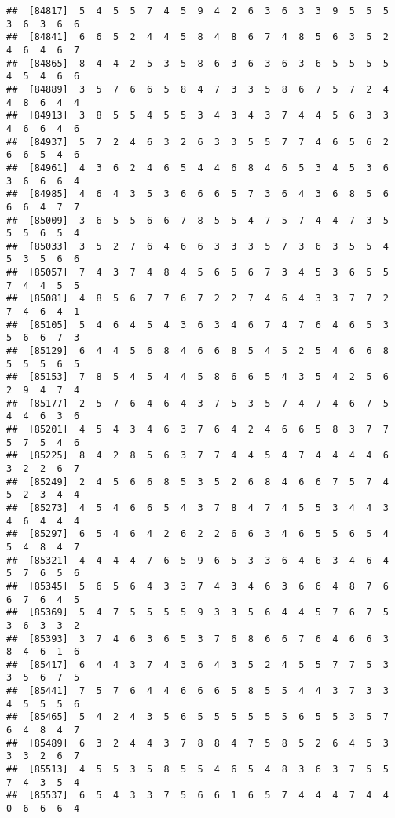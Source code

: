 \documentclass[
]{book}
\begin{document}
\begin{verbatim}
##  [84817]  5  4  5  5  7  4  5  9  4  2  6  3  6  3  3  9  5  5  5  3  6  3  6  6
##  [84841]  6  6  5  2  4  4  5  8  4  8  6  7  4  8  5  6  3  5  2  4  6  4  6  7
##  [84865]  8  4  4  2  5  3  5  8  6  3  6  3  6  3  6  5  5  5  5  4  5  4  6  6
##  [84889]  3  5  7  6  6  5  8  4  7  3  3  5  8  6  7  5  7  2  4  4  8  6  4  4
##  [84913]  3  8  5  5  4  5  5  3  4  3  4  3  7  4  4  5  6  3  3  4  6  6  4  6
##  [84937]  5  7  2  4  6  3  2  6  3  3  5  5  7  7  4  6  5  6  2  6  6  5  4  6
##  [84961]  4  3  6  2  4  6  5  4  4  6  8  4  6  5  3  4  5  3  6  3  6  6  6  4
##  [84985]  4  6  4  3  5  3  6  6  6  5  7  3  6  4  3  6  8  5  6  6  6  4  7  7
##  [85009]  3  6  5  5  6  6  7  8  5  5  4  7  5  7  4  4  7  3  5  5  5  6  5  4
##  [85033]  3  5  2  7  6  4  6  6  3  3  3  5  7  3  6  3  5  5  4  5  3  5  6  6
##  [85057]  7  4  3  7  4  8  4  5  6  5  6  7  3  4  5  3  6  5  5  7  4  4  5  5
##  [85081]  4  8  5  6  7  7  6  7  2  2  7  4  6  4  3  3  7  7  2  7  4  6  4  1
##  [85105]  5  4  6  4  5  4  3  6  3  4  6  7  4  7  6  4  6  5  3  5  6  6  7  3
##  [85129]  6  4  4  5  6  8  4  6  6  8  5  4  5  2  5  4  6  6  8  5  5  5  6  5
##  [85153]  7  8  5  4  5  4  4  5  8  6  6  5  4  3  5  4  2  5  6  2  9  4  7  4
##  [85177]  2  5  7  6  4  6  4  3  7  5  3  5  7  4  7  4  6  7  5  4  4  6  3  6
##  [85201]  4  5  4  3  4  6  3  7  6  4  2  4  6  6  5  8  3  7  7  5  7  5  4  6
##  [85225]  8  4  2  8  5  6  3  7  7  4  4  5  4  7  4  4  4  4  6  3  2  2  6  7
##  [85249]  2  4  5  6  6  8  5  3  5  2  6  8  4  6  6  7  5  7  4  5  2  3  4  4
##  [85273]  4  5  4  6  6  5  4  3  7  8  4  7  4  5  5  3  4  4  3  4  6  4  4  4
##  [85297]  6  5  4  6  4  2  6  2  2  6  6  3  4  6  5  5  6  5  4  5  4  8  4  7
##  [85321]  4  4  4  4  7  6  5  9  6  5  3  3  6  4  6  3  4  6  4  5  7  6  5  6
##  [85345]  5  6  5  6  4  3  3  7  4  3  4  6  3  6  6  4  8  7  6  6  7  6  4  5
##  [85369]  5  4  7  5  5  5  5  9  3  3  5  6  4  4  5  7  6  7  5  3  6  3  3  2
##  [85393]  3  7  4  6  3  6  5  3  7  6  8  6  6  7  6  4  6  6  3  8  4  6  1  6
##  [85417]  6  4  4  3  7  4  3  6  4  3  5  2  4  5  5  7  7  5  3  3  5  6  7  5
##  [85441]  7  5  7  6  4  4  6  6  6  5  8  5  5  4  4  3  7  3  3  4  5  5  5  6
##  [85465]  5  4  2  4  3  5  6  5  5  5  5  5  5  6  5  5  3  5  7  6  4  8  4  7
##  [85489]  6  3  2  4  4  3  7  8  8  4  7  5  8  5  2  6  4  5  3  3  3  2  6  7
##  [85513]  4  5  5  3  5  8  5  5  4  6  5  4  8  3  6  3  7  5  5  7  4  3  5  4
##  [85537]  6  5  4  3  3  7  5  6  6  1  6  5  7  4  4  4  7  4  4  0  6  6  6  4

\end{verbatim}
\end{document}

